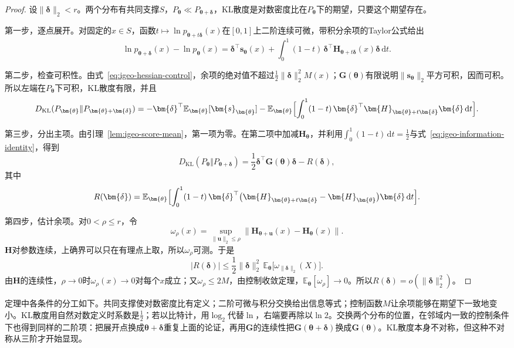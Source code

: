 \begin{proof}
设$\lVert\bm{\delta}\rVert_2<r$。两个分布有共同支撑$S$，$P_{\bm{\theta}}\ll P_{\bm{\theta}+\bm{\delta}}$，KL散度是对数密度比在$P_{\bm{\theta}}$下的期望，只要这个期望存在。

第一步，逐点展开。对固定的$x\in S$，函数$t\mapsto\ln p_{\bm{\theta}+t\bm{\delta}}(x)$在$[0,1]$上二阶连续可微，带积分余项的Taylor公式给出
\[
  \ln p_{\bm{\theta}+\bm{\delta}}(x)-\ln p_{\bm{\theta}}(x)=\bm{\delta}^{\top}\bm{s}_{\bm{\theta}}(x)+\int_{0}^{1}(1-t)\,\bm{\delta}^{\top}\bm{H}_{\bm{\theta}+t\bm{\delta}}(x)\bm{\delta}\,\mathrm{d}t .
\]

第二步，检查可积性。由式~\eqref{eq:igeo-hessian-control}，余项的绝对值不超过$\frac12\lVert\bm{\delta}\rVert_2^{2}M(x)$；$\bm{G}(\bm{\theta})$有限说明$\lVert\bm{s}_{\bm{\theta}}\rVert_2$平方可积，因而可积。所以左端在$P_{\bm{\theta}}$下可积，KL散度有限，并且
\[
  D_{\mathrm{KL}}(P_{\bm{\theta}}\Vert P_{\bm{\theta}+\bm{\delta}})=-\bm{\delta}^{\top}\mathbb{E}_{\bm{\theta}}[\bm{s}_{\bm{\theta}}]-\mathbb{E}_{\bm{\theta}}\Bigl[\int_{0}^{1}(1-t)\,\bm{\delta}^{\top}\bm{H}_{\bm{\theta}+t\bm{\delta}}\bm{\delta}\,\mathrm{d}t\Bigr].
\]

第三步，分出主项。由引理~\ref{lem:igeo-score-mean}，第一项为零。在第二项中加减$\bm{H}_{\bm{\theta}}$，并利用$\int_{0}^{1}(1-t)\,\mathrm{d}t=\frac12$与式~\eqref{eq:igeo-information-identity}，得到
\[
  D_{\mathrm{KL}}(P_{\bm{\theta}}\Vert P_{\bm{\theta}+\bm{\delta}})=\frac12\bm{\delta}^{\top}\bm{G}(\bm{\theta})\bm{\delta}-R(\bm{\delta}),
\]
其中
\[
  R(\bm{\delta})=\mathbb{E}_{\bm{\theta}}\Bigl[\int_{0}^{1}(1-t)\,\bm{\delta}^{\top}\bigl(\bm{H}_{\bm{\theta}+t\bm{\delta}}-\bm{H}_{\bm{\theta}}\bigr)\bm{\delta}\,\mathrm{d}t\Bigr].
\]

第四步，估计余项。对$0<\rho\leq r$，令
\[
  \omega_{\rho}(x)=\sup_{\lVert\bm{u}\rVert_2\leq\rho}\lVert\bm{H}_{\bm{\theta}+\bm{u}}(x)-\bm{H}_{\bm{\theta}}(x)\rVert .
\]
$\bm{H}$对参数连续，上确界可以只在有理点上取，所以$\omega_{\rho}$可测。于是
\[
  \lvert R(\bm{\delta})\rvert\leq\frac12\lVert\bm{\delta}\rVert_2^{2}\,\mathbb{E}_{\bm{\theta}}\bigl[\omega_{\lVert\bm{\delta}\rVert_2}(X)\bigr].
\]
由$\bm{H}$的连续性，$\rho\to0$时$\omega_{\rho}(x)\to0$对每个$x$成立；又$\omega_{\rho}\leq2M$，由控制收敛定理，$\mathbb{E}_{\bm{\theta}}[\omega_{\rho}]\to0$。所以$R(\bm{\delta})=o(\lVert\bm{\delta}\rVert_2^{2})$。
\end{proof}

定理中各条件的分工如下。共同支撑使对数密度比有定义；二阶可微与积分交换给出信息等式；控制函数$M$让余项能够在期望下一致地变小。KL散度用自然对数定义时系数是$\frac12$；若以比特计，用$\log_2$代替$\ln$，右端要再除以$\ln2$。交换两个分布的位置，在邻域内一致的控制条件下也得到同样的二阶项：把展开点换成$\bm{\theta}+\bm{\delta}$重复上面的论证，再用$\bm{G}$的连续性把$\bm{G}(\bm{\theta}+\bm{\delta})$换成$\bm{G}(\bm{\theta})$。KL散度本身不对称，但这种不对称从三阶才开始显现。

